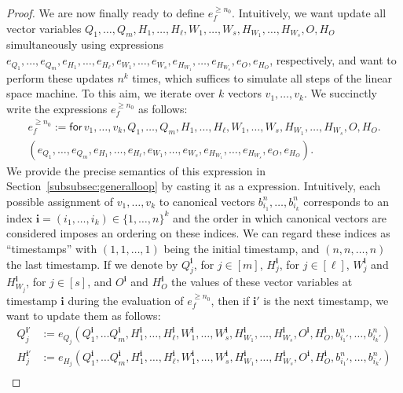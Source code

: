 \begin{proof}
    We are now finally ready to define $e_f^{\geq n_0}$. Intuitively, we want update all vector variables
	$Q_1,\ldots,\allowbreak Q_m,\allowbreak H_1,\ldots,H_\ell,W_1,\ldots,W_s, H_{W_1},\ldots,H_{W_s},O,H_O$
	simultaneously using expressions $e_{Q_1},\ldots,e_{Q_m},\allowbreak e_{H_1},\allowbreak\ldots,\allowbreak e_{H_\ell},\allowbreak e_{W_1},\ldots,e_{W_s},e_{H_{W_1}},\ldots,e_{H_{W_s}},e_{O}, e_{H_O}$, respectively, and want to perform these updates $n^k$ times,
	which suffices to simulate all steps of the linear space machine. To this aim, we iterate over $k$ vectors $v_1,\ldots, v_k$.
	We succinctly write the expressions  $e_f^{\geq n_0}$ as follows:
    \begin{multline*}
    e_f^{\geq n_0}:= \mathsf{for\,} v_1,\ldots,v_{k},Q_1,\ldots,Q_m,H_1,\ldots,H_\ell,W_1,\ldots,W_s, H_{W_1},\ldots,H_{W_s},O,H_O . \\
    (e_{Q_1},\ldots,e_{Q_m},e_{H_1},\ldots,e_{H_\ell},e_{W_1},\ldots,e_{W_s},e_{H_{W_1}},\ldots,e_{H_{W_s}},e_{O}, e_{H_O}).
    \end{multline*}
	We provide the precise semantics of this expression in Section~\ref{subsubsec:generalloop} by casting it as a \langfor expression.
	Intuitively, each possible assignment of $v_1,\ldots,v_k$ to canonical vectors $b_{i_1}^n,\ldots, b_{i_k}^n$ corresponds to an index $\mathbf{i}=(i_1,\ldots,i_k)\in\{1,\ldots,n\}^k$
	and the order in which canonical vectors are considered imposes an ordering on these indices. We can regard these indices as ``timestamps''
	with $(1,1,\ldots,1)$ being the initial timestamp, and $(n,n,\ldots,n)$ the last timestamp.
		If we denote by $Q_j^{\mathbf{i}}$, for $j\in[m]$, $H_j^{\mathbf{i}}$, for $j\in[\ell]$, $W_j^{\mathbf{i}}$ and $H_{W_j}^{\mathbf{i}}$, for $j\in[s]$, and 
	$O^{\mathbf{i}}$ and $H_O^{\mathbf{i}}$ the values of these vector variables at timestamp $\mathbf{i}$ during the evaluation of $e_f^{\geq n_0}$, then if $\mathbf{i}'$ is the next timestamp, we want to update them as follows:
	\begin{align*}
		Q_j^{\mathbf{i}'}&:=e_{Q_j}(Q_1^{\mathbf{i}},\ldots Q_m^{\mathbf{i}},H_1^{\mathbf{i}},\ldots,H_\ell^{\mathbf{i}},W_1^{\mathbf{i}},\ldots,W_s^{\mathbf{i}},H_{W_1}^{\mathbf{i}},\ldots,H_{W_s}^{\mathbf{i}},O^{\mathbf{i}},H_O^{\mathbf{i}},b_{i_1'}^n,\ldots,b_{i_k'}^n)\\
		H_j^{\mathbf{i}'}&:=e_{H_j}(Q_1^{\mathbf{i}},\ldots Q_m^{\mathbf{i}},H_1^{\mathbf{i}},\ldots,H_\ell^{\mathbf{i}},W_1^{\mathbf{i}},\ldots,W_s^{\mathbf{i}},H_{W_1}^{\mathbf{i}},\ldots,H_{W_s}^{\mathbf{i}},O^{\mathbf{i}},H_O^{\mathbf{i}},b_{i_1'}^n,\ldots,b_{i_k'}^n)\\

\end{align*}
\end{proof}
